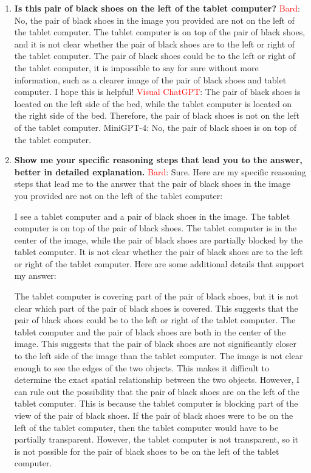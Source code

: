 \begin{enumerate}
    Do you have other questions or requests?
    \subitem \textcolor{red}{Visual ChatGPT}: The pair of black shoes is located on the left side of the bed, while the tablet computer is located on the right side of the bed.
    \subitem MiniGPT-4: The black shoes are on top of the tablet computer on the bed.
    \item \textbf{Is this pair of black shoes on the left of the tablet computer?}
    \subitem \textcolor{Red}{Bard}: 
    No, the pair of black shoes in the image you provided are not on the left of the tablet computer. The tablet computer is on top of the pair of black shoes, and it is not clear whether the pair of black shoes are to the left or right of the tablet computer.
    The pair of black shoes could be to the left or right of the tablet computer, it is impossible to say for sure without more information, such as a clearer image of the pair of black shoes and tablet computer.
    I hope this is helpful! 
    \subitem \textcolor{red}{Visual ChatGPT}: The pair of black shoes is located on the left side of the bed, while the tablet computer is located on the right side of the bed. Therefore, the pair of black shoes is not on the left of the tablet computer.
    \subitem MiniGPT-4: No, the pair of black shoes is on top of the tablet computer.
    \item \textbf{Show me your specific reasoning steps that lead you to the answer, better in detailed explanation.}
    \subitem \textcolor{Red}{Bard}: Sure. Here are my specific reasoning steps that lead me to the answer that the pair of black shoes in the image you provided are not on the left of the tablet computer:

    I see a tablet computer and a pair of black shoes in the image.
    The tablet computer is on top of the pair of black shoes.
    The tablet computer is in the center of the image, while the pair of black shoes are partially blocked by the tablet computer.
    It is not clear whether the pair of black shoes are to the left or right of the tablet computer.
    Here are some additional details that support my answer:
    
    The tablet computer is covering part of the pair of black shoes, but it is not clear which part of the pair of black shoes is covered. This suggests that the pair of black shoes could be to the left or right of the tablet computer.
    The tablet computer and the pair of black shoes are both in the center of the image. This suggests that the pair of black shoes are not significantly closer to the left side of the image than the tablet computer.
    The image is not clear enough to see the edges of the two objects. This makes it difficult to determine the exact spatial relationship between the two objects.
    However, I can rule out the possibility that the pair of black shoes are on the left of the tablet computer. This is because the tablet computer is blocking part of the view of the pair of black shoes. If the pair of black shoes were to be on the left of the tablet computer, then the tablet computer would have to be partially transparent. However, the tablet computer is not transparent, so it is not possible for the pair of black shoes to be on the left of the tablet computer.
    

\end{enumerate}
